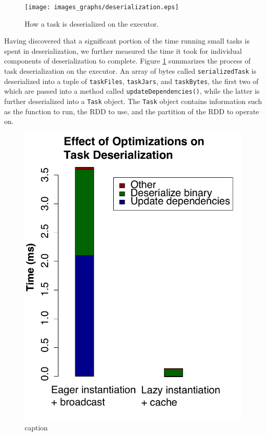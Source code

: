 \begin{figure}[t!]
 \begin{center}
   \texttt{[image: images\_graphs/deserialization.eps]}
 \end{center}
 \caption{How a task is deserialized on the executor. }
 \label{fig:deserialization}
\end{figure}

Having discovered that a significant portion of the time running small tasks is spent in deserialization, we further measured the time it took for individual components of deserialization to complete. Figure \ref{fig:deserialization} summarizes the process of task deserialization on the executor. An array of bytes called \texttt{serializedTask} is deserialized into a tuple of \texttt{taskFiles}, \texttt{taskJars}, and \texttt{taskBytes}, the first two of which are passed into a method called \texttt{updateDependencies()}, while the latter is further deserialized into a \texttt{Task} object. The \texttt{Task} object contains information such as the function to run, the RDD to use, and the partition of the RDD to operate on.

\begin{figure}[t!]
 \begin{center}
   \includegraphics[scale=0.60]{images_graphs/optimizations/graph2/task_deser_micro.pdf}
 \end{center}
 \caption{caption}
 \label{fig:deserialization_times}
\end{figure}

